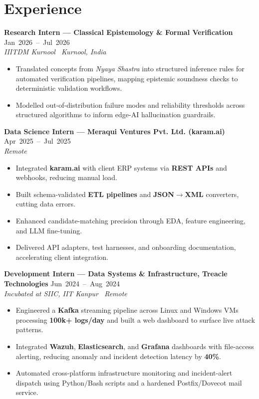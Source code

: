 \documentclass[10pt,a4paper]{article}
\newcommand{\role}[3]{%
  \par\noindent\textbf{\small #1} \hfill \textcolor{muted}{\footnotesize\mbox{#2}}\\
  \textit{\footnotesize #3}\par\vspace{0.4pt}%
}
\begin{document}
\section*{Experience}
\role{Research Intern --- Classical Epistemology \& Formal Verification}{Jan 2026 -- Jul 2026}{IIITDM Kurnool \textbar\ Kurnool, India}
\begin{itemize}\small
\item Translated concepts from \textit{Nyaya Shastra} into structured inference rules for automated verification pipelines, mapping epistemic soundness checks to deterministic validation workflows.
\item Modelled out-of-distribution failure modes and reliability thresholds across structured algorithms to inform edge-AI hallucination guardrails.
\end{itemize}
\vspace{1.2pt}
\role{Data Science Intern --- Meraqui Ventures Pvt. Ltd. (karam.ai)}{Apr 2025 -- Jul 2025}{Remote}
\begin{itemize}\small
\item Integrated \textbf{karam.ai} with client ERP systems via \textbf{REST APIs} and webhooks, reducing manual load.
\item Built schema-validated \textbf{ETL pipelines} and \textbf{JSON$\to$XML} converters, cutting data errors.
\item Enhanced candidate-matching precision through EDA, feature engineering, and LLM fine-tuning.
\item Delivered API adapters, test harnesses, and onboarding documentation, accelerating client integration.
\end{itemize}
\vspace{1.2pt}
\role{Development Intern --- Data Systems \& Infrastructure, Treacle Technologies}{Jun 2024 -- Aug 2024}{Incubated at SIIC, IIT Kanpur \textbar\ Remote}
\begin{itemize}\small
\item Engineered a \textbf{Kafka} streaming pipeline across Linux and Windows VMs processing \textbf{100k+ logs/day} and built a web dashboard to surface live attack patterns.
\item Integrated \textbf{Wazuh}, \textbf{Elasticsearch}, and \textbf{Grafana} dashboards with file-access alerting, reducing anomaly and incident detection latency by \textbf{40\%}.
\item Automated cross-platform infrastructure monitoring and incident-alert dispatch using Python/Bash scripts and a hardened Postfix/Dovecot mail service.
\end{itemize}
\end{document}
